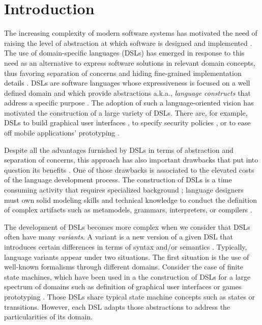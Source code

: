 \section{Introduction}

The increasing complexity of modern software systems has motivated the need of raising the level of abstraction at which software is designed and implemented \cite{Chechik:2010}. The use of domain-specific languages (DSLs) has emerged in response to this need as an alternative to express software solutions in relevant domain concepts, thus favoring separation of concerns and hiding fine-grained implementation details \cite{Jezequel:2014}. DSLs are software languages whose expressiveness is focused on a well defined domain and which provide abstractions a.k.a., \textit{language constructs} that address a specific purpose \cite{Mernik:2005b}. The adoption of such a language-oriented vision has motivated the construction of a large variety of DSLs. There are, for example, DSLs to build graphical user interfaces \cite{Oney:2012}, to specify security policies \cite{Lodderstedt:2002}, or to ease off mobile applications' prototyping \cite{Ribeiro:2014}.

Despite all the advantages furnished by DSLs in terms of abstraction and separation of concerns, this approach has also important drawbacks that put into question its benefits \cite{Gray:2008}. One of those drawbacks is associated to the elevated costs of the language development process. The construction of DSLs is a time consuming activity that requires specialized background \cite{Jezequel:2014}; language designers must own solid modeling skills and technical knowledge to conduct the definition of complex artifacts such as metamodels, grammars, interpreters, or compilers \cite{Jezequel:2014}.

The development of DSLs becomes more complex when we consider that DSLs often have many \textit{variants}. A variant is a new version of a given DSL that introduces certain differences in terms of syntax and/or semantics \cite{Homer:2014}. Typically, language variants appear under two situations. The first situation is the use of well-known formalisms through different domains. Consider the case of finite state machines, which have been used in a the construction of DSLs for a large spectrum of domains such as definition of graphical user interfaces \cite{Oney:2012} or games prototyping \cite{Funk:2012}. Those DSLs share typical state machine concepts such as states or transitions. However, each DSL adapts those abstractions to address the particularities of its domain.


